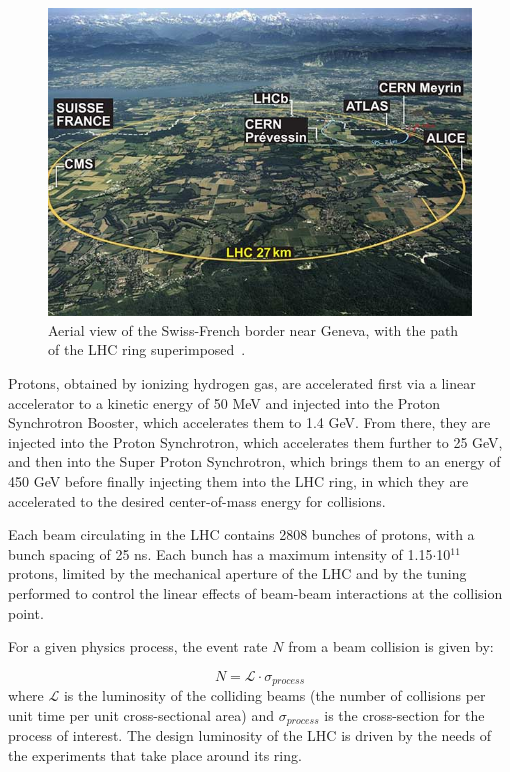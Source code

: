 \begin{figure}[hbtp]
  \begin{center}
    \includegraphics[width=2.0\cmsFigWidth]{figures/lhcring}
    \caption{Aerial view of the Swiss-French border near Geneva, with the path of the LHC ring superimposed~\cite{LHCring}.}
    \label{fig:lhc}
  \end{center}
\end{figure}

Protons, obtained by ionizing hydrogen gas, are accelerated first via a linear accelerator to a kinetic energy of 50 MeV and injected into the Proton Synchrotron Booster, which accelerates them to 1.4 GeV. From there, they are injected into the Proton Synchrotron, which accelerates them further to 25 GeV, and then into the Super Proton Synchrotron, which brings them to an energy of 450 GeV before finally injecting them into the LHC ring, in which they are accelerated to the desired center-of-mass energy for collisions.

Each beam circulating in the LHC contains 2808 bunches of protons, with a bunch spacing of 25 ns. Each bunch has a maximum intensity of 1.15$\cdot$10$^{11}$ protons, limited by the mechanical aperture of the LHC and by the tuning performed to control the linear effects of beam-beam interactions at the collision point.

For a given physics process, the event rate $N$ from a beam collision is given by:

\begin{equation}
N = \mathcal{L}\cdot\sigma_{process}
\label{eq:luminosityxsec}
\end{equation}
where $\mathcal{L}$ is the luminosity of the colliding beams (the number of collisions per unit time per unit cross-sectional area) and $\sigma_{process}$ is the cross-section for the process of interest. The design luminosity of the LHC is driven by the needs of the experiments that take place around its ring.

